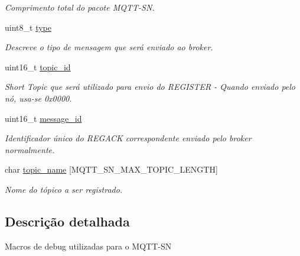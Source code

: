 \begin{DoxyCompactItemize}
\begin{DoxyCompactList}\small\item\em Comprimento total do pacote M\+Q\+T\+T-\/\+S\+N. \end{DoxyCompactList}\item 
\hypertarget{group__Pacotes_ga7aead736a07eaf25623ad7bfa1f0ee2d}{uint8\+\_\+t \hyperlink{group__Pacotes_ga7aead736a07eaf25623ad7bfa1f0ee2d}{type}}\label{group__Pacotes_ga7aead736a07eaf25623ad7bfa1f0ee2d}

\begin{DoxyCompactList}\small\item\em Descreve o tipo de mensagem que será enviado ao broker. \end{DoxyCompactList}\item 
\hypertarget{group__Pacotes_gab0380a82be366f48263095460986c3c7}{uint16\+\_\+t \hyperlink{group__Pacotes_gab0380a82be366f48263095460986c3c7}{topic\+\_\+id}}\label{group__Pacotes_gab0380a82be366f48263095460986c3c7}

\begin{DoxyCompactList}\small\item\em Short Topic que será utilizado para envio do R\+E\+G\+I\+S\+T\+E\+R -\/ Quando enviado pelo nó, usa-\/se 0x0000. \end{DoxyCompactList}\item 
\hypertarget{group__Pacotes_ga5f2be45182f0cc39afb7cc3a8d55a1f1}{uint16\+\_\+t \hyperlink{group__Pacotes_ga5f2be45182f0cc39afb7cc3a8d55a1f1}{message\+\_\+id}}\label{group__Pacotes_ga5f2be45182f0cc39afb7cc3a8d55a1f1}

\begin{DoxyCompactList}\small\item\em Identificador único do R\+E\+G\+A\+C\+K correspondente enviado pelo broker normalmente. \end{DoxyCompactList}\item 
\hypertarget{group__Pacotes_ga4928dc5635290abe481ce340f6d47865}{char \hyperlink{group__Pacotes_ga4928dc5635290abe481ce340f6d47865}{topic\+\_\+name} \mbox{[}M\+Q\+T\+T\+\_\+\+S\+N\+\_\+\+M\+A\+X\+\_\+\+T\+O\+P\+I\+C\+\_\+\+L\+E\+N\+G\+T\+H\mbox{]}}\label{group__Pacotes_ga4928dc5635290abe481ce340f6d47865}

\begin{DoxyCompactList}\small\item\em Nome do tópico a ser registrado. \end{DoxyCompactList}\end{DoxyCompactItemize}


\subsection{Descrição detalhada}
Macros de debug utilizadas para o M\+Q\+T\+T-\/\+S\+N 